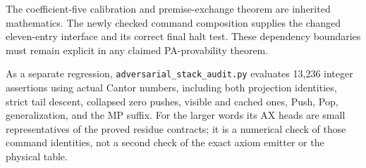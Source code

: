 The coefficient-five calibration and premise-exchange theorem are inherited
mathematics. The newly checked command composition supplies the changed
eleven-entry interface and its correct final halt test. These dependency
boundaries must remain explicit in any claimed PA-provability theorem.

As a separate regression, \texttt{adversarial\_stack\_audit.py} evaluates
13,236 integer assertions using actual Cantor numbers, including both
projection identities, strict tail descent, collapsed zero pushes,
visible and cached ones, Push, Pop, generalization, and the MP suffix.
For the larger words its AX heads are small representatives of the proved
residue contracts; it is a numerical check of those command identities,
not a second check of the exact axiom emitter or the physical table.
